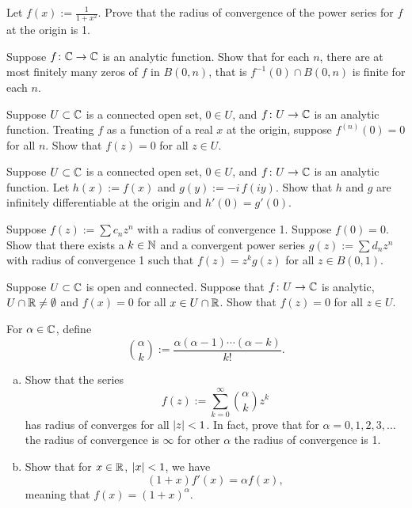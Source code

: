 \begin{exercise}
Let $f(x) := \frac{1}{1+x^2}$.  Prove that the radius of convergence of
the power series for $f$ at the origin is 1.
\end{exercise}


\begin{exercise}
Suppose $f \colon {\mathbb{C}} \to {\mathbb{C}}$ is an analytic function.  Show that for each
$n$, there are at most finitely many zeros of $f$ in $B(0,n)$, that is
$f^{-1}(0) \cap B(0,n)$ is finite for each $n$.
\end{exercise}

\begin{exercise}
Suppose $U \subset {\mathbb{C}}$ is a connected open set, $0 \in U$, and $f \colon U
\to {\mathbb{C}}$ is an analytic function.  Treating $f$ as a function of a real $x$
at the origin, suppose $f^{(n)}(0) = 0$ for all $n$.  Show that $f(z) = 0$
for all $z \in U$.
\end{exercise}

\begin{exercise}
Suppose $U \subset {\mathbb{C}}$ is a connected open set, $0 \in U$, and $f \colon U
\to {\mathbb{C}}$ is an analytic function.  Let $h(x) := f(x)$ and $g(y) := -i \, f(iy)$.
Show that $h$ and $g$ are infinitely differentiable at the origin and
$h'(0) = g'(0)$.
\end{exercise}

\begin{exercise}
Suppose $f(z) := \sum c_n z^n$ with a radius of convergence 1.  Suppose $f(0)
= 0$.  Show that there exists a $k \in {\mathbb{N}}$ and a convergent
power series $g(z) := \sum d_n z^n$ with radius of convergence 1
such that $f(z) = z^k g(z)$ for all $z \in B(0,1)$.
\end{exercise}

\begin{exercise}
Suppose $U \subset {\mathbb{C}}$ is open and connected.  Suppose that
$f \colon U \to {\mathbb{C}}$ is analytic, $U \cap {\mathbb{R}} \not= \emptyset$ and
$f(x) = 0$ for all $x \in U \cap {\mathbb{R}}$.  Show that $f(z) = 0$ for all $z \in
U$.
\end{exercise}

\begin{exercise}
For $\alpha \in {\mathbb{C}}$, define
\begin{equation*}
\binom{\alpha}{k} := \frac{\alpha(\alpha-1)\cdots(\alpha-k)}{k!} .
\end{equation*}
\begin{enumerate}[a)]
\item
Show that the series
\begin{equation*}
f(z) := \sum_{k=0}^\infty \binom{\alpha}{k} z^k
\end{equation*}
has radius of converges for all $\left\lvert {z} \right\rvert < 1$.
In fact, prove that for $\alpha = 0,1,2,3,\ldots$ the radius of
convergence is $\infty$ for other $\alpha$
the radius of convergence is 1.
\item
Show that for $x \in {\mathbb{R}}$, $\left\lvert {x} \right\rvert < 1$, we have
\begin{equation*}
(1+x) f'(x) = \alpha f(x) ,
\end{equation*}
meaning that $f(x) = (1+x)^\alpha$.
\end{enumerate}
\end{exercise}

